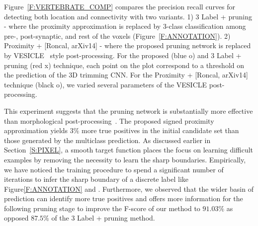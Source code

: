 \documentclass{llncs}
\begin{document}
Figure~\ref{F:VERTEBRATE_COMP} compares the precision recall curves for detecting both location and connectivity with two variants.  1) 3 Label + pruning - where the proximity approximation is replaced by 3-class classification among pre-, post-synaptic, and rest of the voxels (Figure~\ref{F:ANNOTATION}). 2) Proximity + [Roncal, arXiv14] - where the proposed pruning network is replaced by VESICLE~\cite{roncal14vesicle} style post-processing. For the proposed (blue o) and 3 Label + pruning (red x) technique, each point on the plot correspond to a threshold on the prediction of the 3D trimming CNN. For the Proximity + [Roncal, arXiv14] technique (black o), we varied several parameters of the VESICLE post-processing.
\begin{figure*}[t]
\vspace{-0.2cm}
\begin{center}
\vspace{-0.2cm}
\vspace{-0.5cm}
\caption{\scriptsize Precision recall curves for \emph{synapse location and connectivity} for rat cortex~ and mouse cortex (SNEMI)  experiments. Plot  suggests combining voxelwise signed proximity prediction with pruning performs significantly better than the versions that replaces one of these components with alternative strategies. Plot  indicates significant improvement achieved over performance of~\cite{staffler17synem} on the same dataset.}\label{F:VERTEBRATE_COMP}
\end{center}
\vspace{-0.6cm}
\end{figure*}

This experiment suggests that the pruning network is substantially more effective than morphological post-processing~\cite{roncal14vesicle}. The proposed signed proximity approximation yields $3\%$ more true positives in the initial candidate set than those generated by the multiclass prediction. As discussed earlier in Section~\ref{S:PIXEL}, a smooth target function places the focus on learning difficult examples by removing the necessity to learn the sharp boundaries. Empirically, we have noticed the training procedure to spend a significant number of iterations to infer the sharp boundary of a discrete label like Figure\ref{F:ANNOTATION} and . Furthermore, we observed that the wider basin of prediction can identify more true positives and offers more information for the following pruning stage to improve the F-score of our method to $91.03\%$ as opposed $87.5\%$ of the 3 Label + pruning method. 
\end{document}
